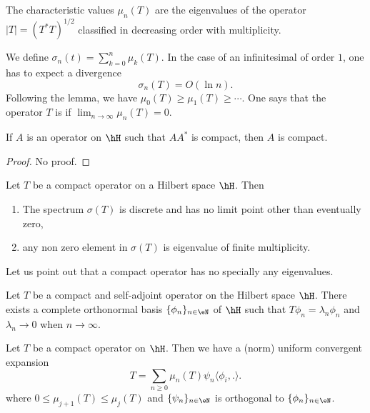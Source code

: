 \begin{lemma}
The characteristic values $\mu_n(T)$ are the eigenvalues of the operator $| T |=(T^*T)^{1/2}$ classified in decreasing order with multiplicity. 
\end{lemma}



We define $\sigma_n(t)=\sum_{k=0}^n\mu_k(T)$. In the case of an infinitesimal of order $1$, one has to expect a divergence 
\[ 
  \sigma_n(T)=O(\ln n).
\]
Following the lemma, we have $\mu_0(T)\geq\mu_1(T)\geq\cdots$. One says that the operator $T$ is  if $\lim_{n\to\infty}\mu_n(T)=0$.

\begin{lemma}		\label{LemAstAcomAcomp}
	If $A$ is an operator on $\hH$ such that $AA^*$ is compact, then $A$ is compact.
\end{lemma}

\begin{proof}
	No proof.
\end{proof}


\begin{proposition}
Let $T$ be a compact operator on a Hilbert space $\hH$. Then
\begin{enumerate}
\item The spectrum $\sigma(T)$ is discrete and has no limit point other than eventually zero,
\item any non zero element in $\sigma(T)$ is eigenvalue of finite multiplicity.
\end{enumerate}
\end{proposition}
Let us point out that a compact operator has no specially any eigenvalues.

\begin{proposition}
Let $T$ be a compact and self-adjoint operator on the Hilbert space $\hH$. There exists a complete orthonormal basis $\{ \phi_n \}_{n\in\eN}$ of $\hH$ such that $T\phi_n=\lambda_n\phi_n$ and $\lambda_n\to0$ when $n\to\infty$.
\end{proposition}

\begin{proposition}
Let $T$ be a compact operator on $\hH$. Then we have a (norm) uniform convergent expansion 
\[ 
  T=\sum_{n\geq 0}\mu_n(T)\psi_n\langle \phi_i, .\rangle .
\]
where $0\leq\mu_{j+1}(T)\leq\mu_j(T)$ and $\{ \psi_n \}_{n\in\eN}$ is orthogonal to $\{ \phi_n \}_{n\in\eN}$.
\end{proposition}

